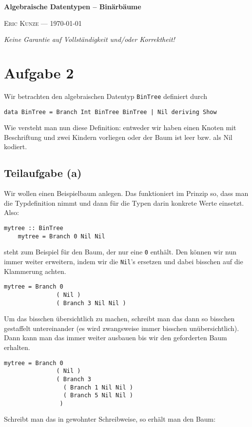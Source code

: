 \documentclass[ngerman, a4paper, 11pt]{article}
\theoremstyle{nonumberplain}
\newcommand*\ruleline[1]{\par\noindent\raisebox{.8ex}{\makebox[\linewidth]{\hrulefill\hspace{1ex}\raisebox{-.8ex}{#1}\hspace{1ex}\hrulefill}}}
\begin{document}
	\begin{center}
		{\bfseries \sffamily \huge Algebraische Datentypen -- Binärbäume} 
		
		\ruleline{\sffamily \Large Übungsblatt 3}
		
		{\scshape Eric Kunze --- \today}
	\end{center}
	\medskip
	
	{ \footnotesize \doclicenseThis }
	
	\begin{center}
		\small \slshape Keine Garantie auf Vollständigkeit und/oder Korrektheit!
	\end{center}
	
\section*{Aufgabe 2}

Wir betrachten den algebraischen Datentyp \texttt{BinTree} definiert durch
\begin{lstlisting}[style=noframe]
	data BinTree = Branch Int BinTree BinTree | Nil deriving Show
\end{lstlisting}
Wie versteht man nun diese Definition: entweder wir haben einen Knoten mit Beschriftung und zwei Kindern vorliegen oder der Baum ist leer bzw. als Nil kodiert.


\subsection*{Teilaufgabe (a)} \label{sec: a}

Wir wollen einen Beispielbaum anlegen. Das funktioniert im Prinzip so, dass man die Typdefinition nimmt und dann für die Typen darin konkrete Werte einsetzt. Also:
\begin{lstlisting}[style=noframe]
	mytree :: BinTree
	mytree = Branch 0 Nil Nil
\end{lstlisting}
steht zum Beispiel für den Baum, der nur eine \texttt{0} enthält. Den können wir nun immer weiter erweitern, indem wir die \texttt{Nil}'s ersetzen und dabei bisschen auf die Klammerung achten. 
\begin{lstlisting}[style=noframe]
	mytree = Branch 0 
	           ( Nil )
	           ( Branch 3 Nil Nil )
\end{lstlisting}
Um das bisschen übersichtlich zu machen, schreibt man das dann so bisschen gestaffelt untereinander (es wird zwangsweise immer bisschen unübersichtlich). Dann kann man das immer weiter ausbauen bis wir den geforderten Baum erhalten.
\begin{lstlisting}[style=frame, firstnumber=12]
	mytree = Branch 0 
	           ( Nil )
	           ( Branch 3 
	             ( Branch 1 Nil Nil )
	             ( Branch 5 Nil Nil )
	            )
\end{lstlisting}
Schreibt man das in gewohnter Schreibweise, so erhält man den Baum:
\end{document}
